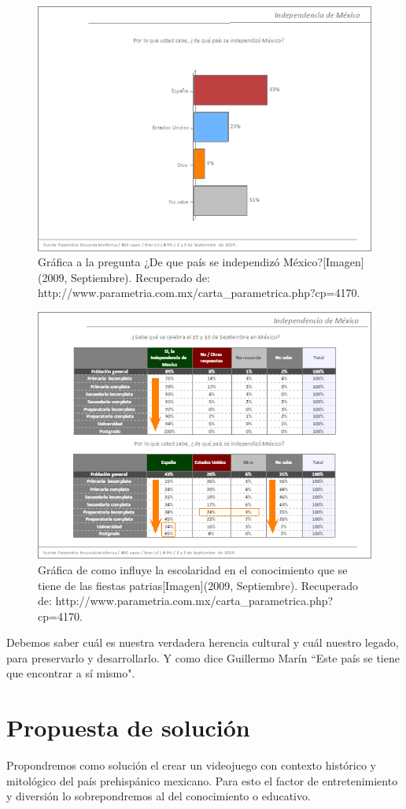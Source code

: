 \begin{figure}
	\centering 
	\includegraphics[width=.5\textwidth]{03MarcoTeorico/imageR/enc02}
	\caption{Gráfica a la pregunta ¿De que país se independizó México?[Imagen](2009, Septiembre). Recuperado de: http://www.parametria.com.mx/carta\_parametrica.php?cp=4170.}
	\label{fig:enc02}
\end{figure}

\begin{figure}
	\centering 
	\includegraphics[width=.5\textwidth]{03MarcoTeorico/imageR/enc03}
	\caption{Gráfica de como influye la escolaridad en el conocimiento que se tiene de las fiestas patrias[Imagen](2009, Septiembre). Recuperado de: http://www.parametria.com.mx/carta\_parametrica.php?cp=4170.}
	\label{fig:enc03}
\end{figure}

Debemos saber cuál es nuestra verdadera herencia cultural y cuál nuestro legado, para preservarlo y desarrollarlo. Y como dice Guillermo Marín \cite{pp07} ``Este país se tiene que encontrar a sí mismo".
\\[1pt]


\section{Propuesta de solución}
Propondremos como solución el crear un videojuego con contexto histórico y mitológico del país prehispánico mexicano. Para esto el factor de entretenimiento y diversión lo sobrepondremos al del conocimiento o educativo.
\\[1pt]

